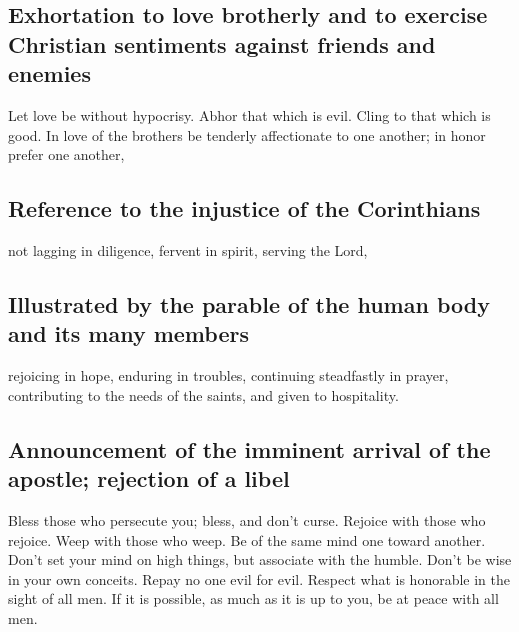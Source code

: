 \hypertarget{exhortation-to-love-brotherly-and-to-exercise-christian-sentiments-against-friends-and-enemies}{%
\subsection{Exhortation to love brotherly and to exercise Christian
sentiments against friends and
enemies}\label{exhortation-to-love-brotherly-and-to-exercise-christian-sentiments-against-friends-and-enemies}}

 Let love be without hypocrisy. Abhor that which is evil.
Cling to that which is good.  In love of the brothers be
tenderly affectionate to one another; in honor prefer one another,

\hypertarget{reference-to-the-injustice-of-the-corinthians}{%
\subsection{Reference to the injustice of the
Corinthians}\label{reference-to-the-injustice-of-the-corinthians}}

 not lagging in diligence, fervent in spirit, serving the
Lord,

\hypertarget{illustrated-by-the-parable-of-the-human-body-and-its-many-members}{%
\subsection{Illustrated by the parable of the human body and its many
members}\label{illustrated-by-the-parable-of-the-human-body-and-its-many-members}}

 rejoicing in hope, enduring in troubles, continuing
steadfastly in prayer,  contributing to the needs of the
saints, and given to hospitality.

\hypertarget{announcement-of-the-imminent-arrival-of-the-apostle-rejection-of-a-libel}{%
\subsection{Announcement of the imminent arrival of the apostle;
rejection of a
libel}\label{announcement-of-the-imminent-arrival-of-the-apostle-rejection-of-a-libel}}

 Bless those who persecute you; bless, and don't curse.
 Rejoice with those who rejoice. Weep with those who
weep.  Be of the same mind one toward another. Don't set
your mind on high things, but associate with the humble. Don't be wise
in your own conceits.  Repay no one evil for evil.
Respect what is honorable in the sight of all men.  If it
is possible, as much as it is up to you, be at peace with all men.

